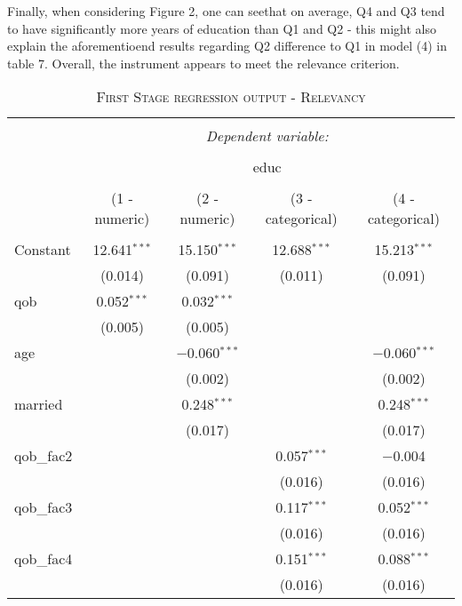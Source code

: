 \documentclass[a4paper]{article}
\begin{document}
Finally, when considering Figure 2, one can seethat on average, Q4 and Q3 tend to have significantly more years of education than Q1 and Q2 - this might also explain the aforementioend results regarding Q2 difference to Q1 in model (4) in table 7. Overall, the instrument appears to meet the relevance criterion. 






\begin{table}[!htbp] \centering 
\begin{adjustwidth}{0.cm}{-0cm}
\begin{threeparttable}
\small
\captionsetup{font=small, justification=raggedright,singlelinecheck=false}
\caption{\textsc{First Stage regression output - Relevancy}}
\centering 
  \label{}
\small 
\begin{tabular}{@{\extracolsep{-2pt}}lcccc} 
\\[-5.8ex]\hline 
\hline \\[-1.8ex] 
 & \multicolumn{4}{c}{\textit{Dependent variable:}} \\ 
\cline{2-5} 
\\[-1.8ex] & \multicolumn{4}{c}{educ} \\ 
\\[-1.8ex] & (1 - numeric) & (2 - numeric) & (3 - categorical) & (4 - categorical)\\ 
\hline \\[-1.8ex] 
 Constant & 12.641$^{***}$ & 15.150$^{***}$ & 12.688$^{***}$ & 15.213$^{***}$ \\ 
  & (0.014) & (0.091) & (0.011) & (0.091) \\ 
  qob & 0.052$^{***}$ & 0.032$^{***}$ &  &  \\ 
  & (0.005) & (0.005) &  &  \\ 
  age &  & $-$0.060$^{***}$ &  & $-$0.060$^{***}$ \\ 
  &  & (0.002) &  & (0.002) \\ 
  married &  & 0.248$^{***}$ &  & 0.248$^{***}$ \\ 
  &  & (0.017) &  & (0.017) \\ 
  qob\_fac2 &  &  & 0.057$^{***}$ & $-$0.004 \\ 
  &  &  & (0.016) & (0.016) \\ 
  qob\_fac3 &  &  & 0.117$^{***}$ & 0.052$^{***}$ \\ 
  &  &  & (0.016) & (0.016) \\ 
  qob\_fac4 &  &  & 0.151$^{***}$ & 0.088$^{***}$ \\ 
  &  &  & (0.016) & (0.016) \\ 

\end{tabular}
\end{threeparttable}
\end{adjustwidth}
\end{table}
\end{document}
